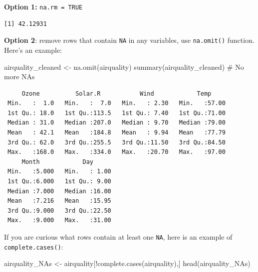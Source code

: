 \documentclass[
  letterpaper,
  DIV=11,
  numbers=noendperiod]{scrreprt}
\newenvironment{Shaded}{\begin{snugshade}}{\end{snugshade}}
\newcommand{\AttributeTok}[1]{\textcolor[rgb]{0.40,0.45,0.13}{#1}}
\newcommand{\CommentTok}[1]{\textcolor[rgb]{0.37,0.37,0.37}{#1}}
\newcommand{\ConstantTok}[1]{\textcolor[rgb]{0.56,0.35,0.01}{#1}}
\newcommand{\FunctionTok}[1]{\textcolor[rgb]{0.28,0.35,0.67}{#1}}
\newcommand{\NormalTok}[1]{\textcolor[rgb]{0.00,0.23,0.31}{#1}}
\newcommand{\OtherTok}[1]{\textcolor[rgb]{0.00,0.23,0.31}{#1}}
\newcommand{\SpecialCharTok}[1]{\textcolor[rgb]{0.37,0.37,0.37}{#1}}
\begin{document}
\textbf{Option 1:} \texttt{na.rm\ =\ TRUE}

\begin{Shaded}
\end{Shaded}

\begin{verbatim}
[1] 42.12931
\end{verbatim}

\textbf{Option 2}: remove rows that contain \texttt{NA} in any
variables, use \texttt{na.omit()} function. Here's an example:

\begin{Shaded}
\begin{Highlighting}[]
\NormalTok{airquality\_cleaned }\OtherTok{\textless{}{-}} \FunctionTok{na.omit}\NormalTok{(airquality)}
\FunctionTok{summary}\NormalTok{(airquality\_cleaned) }\CommentTok{\# No more NA\textquotesingle{}s}
\end{Highlighting}
\end{Shaded}

\begin{verbatim}
     Ozone          Solar.R           Wind            Temp      
 Min.   :  1.0   Min.   :  7.0   Min.   : 2.30   Min.   :57.00  
 1st Qu.: 18.0   1st Qu.:113.5   1st Qu.: 7.40   1st Qu.:71.00  
 Median : 31.0   Median :207.0   Median : 9.70   Median :79.00  
 Mean   : 42.1   Mean   :184.8   Mean   : 9.94   Mean   :77.79  
 3rd Qu.: 62.0   3rd Qu.:255.5   3rd Qu.:11.50   3rd Qu.:84.50  
 Max.   :168.0   Max.   :334.0   Max.   :20.70   Max.   :97.00  
     Month            Day       
 Min.   :5.000   Min.   : 1.00  
 1st Qu.:6.000   1st Qu.: 9.00  
 Median :7.000   Median :16.00  
 Mean   :7.216   Mean   :15.95  
 3rd Qu.:9.000   3rd Qu.:22.50  
 Max.   :9.000   Max.   :31.00  
\end{verbatim}

If you are curious what rows contain at least one \texttt{NA}, here is
an example of \texttt{complete.cases()}:

\begin{Shaded}
\begin{Highlighting}[]
\NormalTok{airquality\_NAs }\OtherTok{\textless{}{-}}\NormalTok{ airquality[}\SpecialCharTok{!}\FunctionTok{complete.cases}\NormalTok{(airquality),]}
\FunctionTok{head}\NormalTok{(airquality\_NAs)}
\end{Highlighting}
\end{Shaded}
\end{document}
